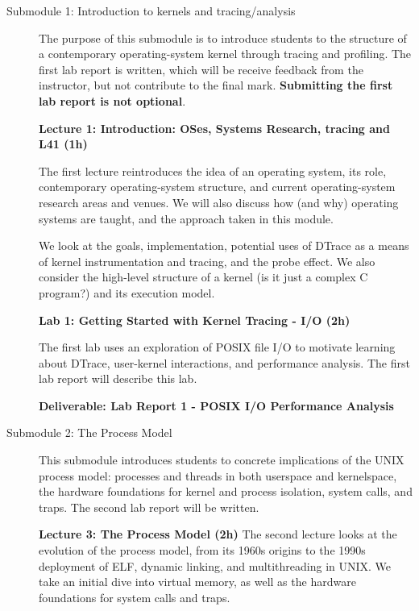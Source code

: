 \documentclass[a4paper,10pt]{article}
\begin{document}
\begin{description}
\item[Submodule 1: Introduction to kernels and tracing/analysis]
  The purpose of this submodule is to introduce students to the structure of
  a contemporary operating-system kernel through tracing and profiling.
  The first lab report is written, which will be receive feedback from the
  instructor, but not contribute to the final mark.
  \textbf{Submitting the first lab report is not optional}.

  \noindent
  \textbf{Lecture 1: Introduction: OSes, Systems Research, tracing and L41 (1h)}

  The first lecture reintroduces the idea of an operating system, its
  role, contemporary operating-system structure, and current operating-system
  research areas and venues.
  We will also discuss how (and why) operating systems are taught, and the
  approach taken in this module.


  We look at the goals, implementation, potential uses of DTrace as a means of
  kernel instrumentation and tracing, and the probe effect.
  We also consider the high-level structure of a kernel (is it just a complex
  C program?) and its execution model.


  \noindent
  \textbf{Lab 1: Getting Started with Kernel Tracing - I/O (2h)}

  The first lab uses an exploration of POSIX file I/O to motivate learning
  about DTrace, user-kernel interactions, and performance analysis.
  The first lab report will describe this lab.

  \noindent
  \textbf{Deliverable: Lab Report 1 - POSIX I/O Performance Analysis}

\item[Submodule 2: The Process Model]
  This submodule introduces students to concrete implications of the UNIX
  process model: processes and threads in both userspace and kernelspace, the
  hardware foundations for kernel and process isolation, system calls, and
  traps.
  The second lab report will be written.

  \noindent
  \textbf{Lecture 3: The Process Model (2h)}
  The second lecture looks at the evolution of the process model, from its
  1960s origins to the 1990s deployment of ELF, dynamic linking, and
  multithreading in UNIX.
  We take an initial dive into virtual memory, as well as the hardware
  foundations for system calls and traps.


\end{description}
\end{document}
